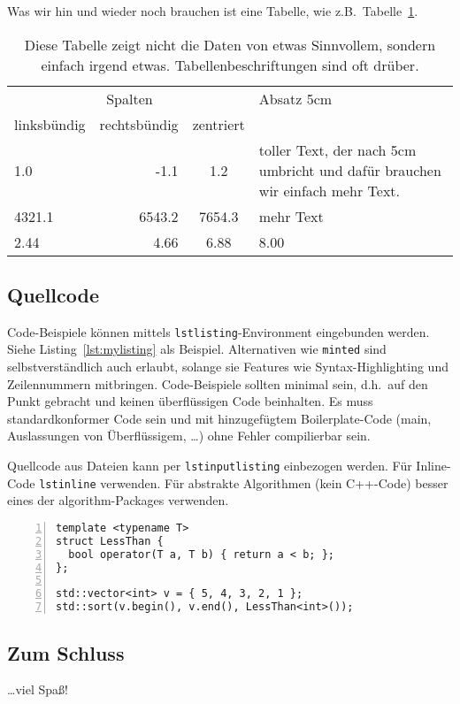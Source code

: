 \documentclass[a4paper,12pt]{llncs}
\numberwithin{equation}{section}
\begin{document}
Was wir hin und wieder noch brauchen ist eine Tabelle, wie z.B.\
Tabelle~\ref{tab:irgendwas}.
\begin{table}[htbp]
  \centering
  \caption{Diese Tabelle zeigt nicht die Daten von etwas Sinnvollem,
    sondern einfach irgend etwas. Tabellenbeschriftungen sind oft drüber.}
  \label{tab:irgendwas}
  \begin{tabular}{lrcp{5cm}}
    \toprule
    \multicolumn{3}{c}{Spalten} & Absatz 5cm \\
    \cmidrule(lr){1-3}
    linksbündig & rechtsbündig & zentriert & \\
    \midrule
    1.0 & -1.1 & 1.2 & toller Text, der nach 5cm umbricht und dafür
    brauchen wir einfach mehr Text. \\
    4321.1 & 6543.2 & 7654.3 & mehr Text \\
    2.44 & 4.66 & 6.88 & 8.00 \\
    \bottomrule
  \end{tabular}
\end{table}

\subsection{Quellcode}
Code-Beispiele können mittels \texttt{lstlisting}-Environment eingebunden
werden.
Siehe Listing~\ref{lst:mylisting} als Beispiel.
Alternativen wie \texttt{minted} sind selbstverständlich auch erlaubt, solange
sie Features wie Syntax-Highlighting und Zeilennummern mitbringen.
Code-Beispiele sollten minimal sein, d.h.\ auf den Punkt gebracht und keinen
überflüssigen Code beinhalten.
Es muss standardkonformer Code sein und mit hinzugefügtem Boilerplate-Code
(main, Auslassungen von Überflüssigem, \dots) ohne Fehler compilierbar sein.

Quellcode aus Dateien kann per \texttt{lstinputlisting} einbezogen werden.
Für Inline-Code \texttt{lstinline} verwenden.
Für abstrakte Algorithmen (kein C++-Code) besser eines der algorithm-Packages
verwenden.

\begin{lstlisting}[style=cpp,caption={Example using Lstlisting},label={lst:mylisting},numbers=left]
template <typename T>
struct LessThan {
  bool operator(T a, T b) { return a < b; };
};

std::vector<int> v = { 5, 4, 3, 2, 1 };
std::sort(v.begin(), v.end(), LessThan<int>());
\end{lstlisting}


\subsection{Zum Schluss}
\dots viel Spaß!

\newpage



\end{document}

